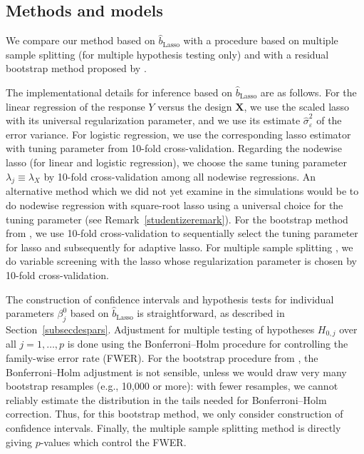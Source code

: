 \documentclass[aos,MSNbibl,dvips]{arximspdf}
\newcommand{\eps}{\varepsilon}
\newcommand{\bx}{\mathbf{X}}
\begin{document}
\subsection{Methods and models}

We compare our method based on $\hat{b}_{\mathrm{Lasso}}$ with a procedure
based on multiple sample splitting \cite{memepb09} (for multiple
hypothesis testing
only) and with a residual bootstrap method proposed by \cite{chatter13}.

The implementational details for inference based on
$\hat{b}_{\mathrm{Lasso}}$ are as follows. For the linear regression
of the
response $Y$ versus the design $\bx$, we
use the scaled lasso~\cite{sunzhang11} with its universal
regularization parameter, and we use its estimate
$\hat{\sigma}^2_{\eps}$ of the error variance. For logistic
regression, we
use the corresponding lasso estimator with tuning parameter from 10-fold
cross-validation. Regarding the nodewise
lasso (for linear and logistic regression), we choose the same tuning
parameter $\lambda_j \equiv\lambda_X$ by
10-fold cross-validation among all nodewise regressions.
An alternative method which we did not yet examine in the simulations
would be to do nodewise regression with
square-root lasso using a universal choice for the tuning parameter
(see Remark~\ref{studentizeremark}).
For the bootstrap
method from \cite{chatter13}, we use 10-fold cross-validation to
sequentially select the tuning parameter for lasso and subsequently for
adaptive lasso. For multiple sample splitting \cite{memepb09}, we do
variable screening with the lasso whose regularization parameter is chosen
by 10-fold cross-validation.

The construction of confidence intervals and hypothesis tests for
individual parameters $\beta^0_j$ based on
$\hat{b}_{\mathrm{Lasso}}$ is straightforward, as described in
Section~\ref{subsecdespars}. Adjustment for multiple testing of hypotheses
$H_{0,j}$ over all $j=1,\ldots,p$ is done using the Bonferroni--Holm
procedure for controlling the family-wise error rate (FWER). For the
bootstrap procedure from \cite{chatter13}, the Bonferroni--Holm adjustment
is not sensible, unless we would draw very many bootstrap resamples
(e.g., 10,000
or more): with fewer resamples, we cannot reliably estimate the
distribution in the tails needed for Bonferroni--Holm correction. Thus, for
this bootstrap method, we
only consider construction of confidence intervals. Finally, the
multiple sample splitting method \cite{memepb09} is
directly giving $p$-values which control the FWER.
\end{document}
